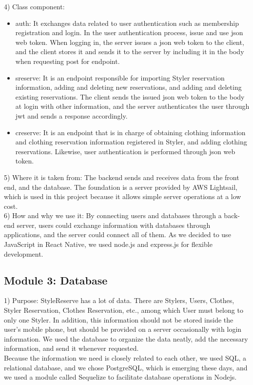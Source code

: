 \documentclass[conference]{IEEEtran}
\begin{document}
4) Class component:
\begin{itemize}
    \item auth: It exchanges data related to user authentication such as membership registration and login. In the user authentication process, issue and use json web token. When logging in, the server issues a json web token to the client, and the client stores it and sends it to the server by including it in the body when requesting post for endpoint.
    
    \item sreserve: It is an endpoint responsible for importing Styler reservation information, adding and deleting new reservations, and adding and deleting existing reservations. The client sends the issued json web token to the body at login with other information, and the server authenticates the user through jwt and sends a response accordingly.
    
    \item creserve: It is an endpoint that is in charge of obtaining clothing information and clothing reservation information registered in Styler, and adding clothing reservations. Likewise, user authentication is performed through json web token.

\end{itemize}

5) Where it is taken from: The backend sends and receives data from the front end, and the database. The foundation is a server provided by AWS Lightsail, which is used in this project because it allows simple server operations at a low cost.\\

6) How and why we use it: By connecting users and databases through a back-end server, users could exchange information with databases through applications, and the server could connect all of them. As we decided to use JavaScript in React Native, we used node.js and express.js for flexible development.\\

\subsection{Module 3: Database}
1) Purpose: StyleReserve has a lot of data. There are Stylers, Users, Clothes, Styler Reservation, Clothes Reservation, etc., among which User must belong to only one Styler. In addition, this information should not be stored inside the user's mobile phone, but should be provided on a server occasionally with login information. We used the database to organize the data neatly, add the necessary information, and send it whenever requested.\\
Because the information we need is closely related to each other, we used SQL, a relational database, and we chose PostgreSQL, which is emerging these days, and we used a module called Sequelize to facilitate database operations in Nodejs.\\
\end{document}
